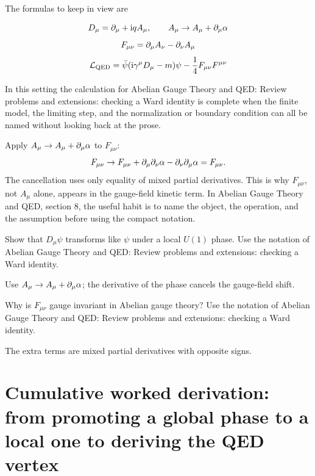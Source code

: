 The formulas to keep in view are

\[
  D_\mu=\partial_\mu+\mathrm i qA_\mu,\qquad A_\mu\to A_\mu+\partial_\mu\alpha
\]
\[
  F_{\mu\nu}=\partial_\mu A_\nu-\partial_\nu A_\mu
\]
\[
  \mathcal L_{\mathrm{QED}}=\bar\psi(\mathrm i\gamma^\mu D_\mu-m)\psi-\frac14F_{\mu\nu}F^{\mu\nu}
\]

In this setting the calculation for Abelian Gauge Theory and QED: Review problems and extensions: checking a Ward identity is complete when the finite model, the limiting step, and the normalization or boundary condition can all be named without looking back at the prose.




\begin{example}
Apply \(A_\mu\to A_\mu+\partial_\mu\alpha\) to \(F_{\mu\nu}\):
\[
  F_{\mu\nu}\to F_{\mu\nu}+\partial_\mu\partial_\nu\alpha-\partial_\nu\partial_\mu\alpha=F_{\mu\nu}.
\]
The cancellation uses only equality of mixed partial derivatives.  This is why \(F_{\mu\nu}\), not \(A_\mu\) alone, appears in the gauge-field kinetic term.  In Abelian Gauge Theory and QED, section 8, the useful habit is to name the object, the operation, and the assumption before using the compact notation.
\end{example}



\begin{exercise}
Show that \(D_\mu\psi\) transforms like \(\psi\) under a local \(U(1)\) phase.  Use the notation of Abelian Gauge Theory and QED: Review problems and extensions: checking a Ward identity.
\begin{answer}
Use \(A_\mu\to A_\mu+\partial_\mu\alpha\); the derivative of the phase cancels the gauge-field shift.
\end{answer}
\end{exercise}

\begin{exercise}
Why is \(F_{\mu\nu}\) gauge invariant in Abelian gauge theory?  Use the notation of Abelian Gauge Theory and QED: Review problems and extensions: checking a Ward identity.
\begin{answer}
The extra terms are mixed partial derivatives with opposite signs.
\end{answer}
\end{exercise}



\section{Cumulative worked derivation: from promoting a global phase to a local one to deriving the QED vertex}

